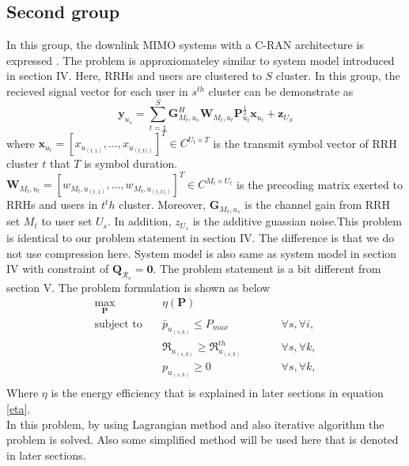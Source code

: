 \documentclass[journal,onecolumn,11pt,draftcls,doublespace]{IEEEtran}
\begin{document}
\subsection{Second group}
In this group, the downlink MIMO systems with a C-RAN architecture is expressed \cite{33,55}. The problem is approxiomateley similar to system model introduced in section IV.
Here, RRHs and users are clustered to $S$ cluster. 
In this group, the recieved signal vector for each user in $s^{th}$ cluster can be demonstrate as 
\begin{equation} \label{sg}
\textbf{y}_{u_s} = \sum_{t=1}^S \textbf{G}_{M_t,u_s}^H \textbf{W}_{M_t,u_t} \textbf{P}_{u_t}^{\frac{1}{2}} \textbf{x}_{ u_t} + \textbf{z}_{U_S}
\end{equation}
where $\textbf{x}_{ u_t} = [x_{ u_{(t,1)}},..., x_{ u_{(t,U_t)}}]^T \in C^{ U_t \times T} $ is the transmit symbol vector of RRH cluster $t$ that $T$ is symbol duration. 
 $\textbf{W}_{M_t, u_t} = [w_{ M_t,u_{(t,1)}},..., w_{M_t, u_{(t,U_t)}}]^T \in C^{ M_t \times U_t} $ is the precoding matrix exerted to RRHs  and users in $t^th$ cluster.
 Moreover, $\textbf{G}_{M_t,u_s}$ is the channel gain from RRH set $M_t$ to user set $U_s$. In addition, $z_{U_s}$ is the additive guassian noise.This problem is identical to our problem statement in section IV. The difference is that we do not use compression here. System model is also same as system model in section IV with constraint of
   $\boldsymbol{Q}_{\mathcal{R}_v} = \boldsymbol{0}$. The problem statement is a bit different from section V. The problem formulation is shown as below \cite{33}
   \begin{equation}\label{p12}
\begin{aligned}
\max\limits_{\boldsymbol{P}}   \quad &   \eta(\boldsymbol{P})\\
\text{subject to} \quad  & \bar{p}_{u_{(s,k)}} \leq P_{max} && \qquad \forall s, \forall i,   \\
&\mathfrak{R}_{u_{(s,k)}} \geq  \mathfrak{R}_{u_{(s,k)}}^{th} && \qquad \forall s, \forall k, \\
&p_{u_{(s,k)}}  \geq 0                                  &&\qquad \forall s, \forall k, \\
\end{aligned}			
\end{equation}  
Where $\eta$ is the energy efficiency that is explained in later sections in equation \eqref{eta}. \\
In this problem, by using Lagrangian method and also iterative algorithm the problem is solved. Also some simplified method will be used here that is denoted in later sections.
\end{document}
